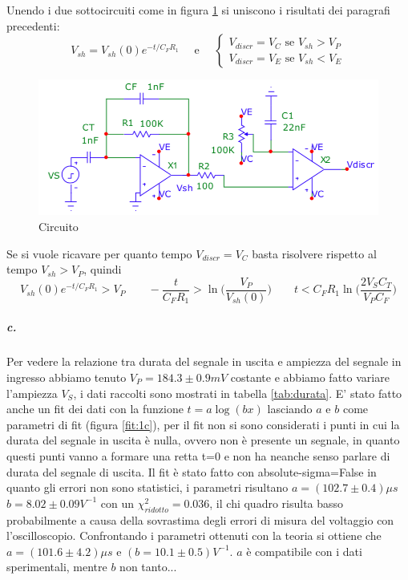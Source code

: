 \documentclass{article}
\newcommand{\vz}{V_{sh}(0)}
\begin{document}
		Unendo i due sottocircuiti come in figura \ref{fig:circ} si uniscono i risultati dei paragrafi precedenti:
		\begin{equation}
			V_{sh}=\vz e^{-t/C_FR_1}\quad \textrm{ e }\quad 
			\begin{cases}
				V_{discr}=V_C \textrm{ se } V_{sh}>V_P\\
				V_{discr}=V_E \textrm{ se } V_{sh}<V_E
			\end{cases}
		\end{equation}
		\begin{figure}
			\label{fig:circ}
			\centering
			\includegraphics[width=120mm]{immagini/circa.png}
			\caption{Circuito}
		\end{figure}
		Se si vuole ricavare per quanto tempo $V_{discr}=V_C$ basta risolvere rispetto al tempo $V_{sh}>V_P$, quindi
		\begin{equation}
			\vz e^{-t/C_FR_1}>V_P\qquad-\frac{t}{C_FR_1}>\ln \bigg(\frac{V_P}{\vz }\bigg)\qquad t<C_FR_1\ln \bigg(\frac{2V_SC_T}{V_PC_F}\bigg)
		\end{equation}

	
	\subparagraph{c.}
		Per vedere la relazione tra durata del segnale in uscita e ampiezza del segnale in ingresso abbiamo tenuto $V_P=184.3\pm0.9 mV$ costante e abbiamo fatto variare l'ampiezza $V_S$, i dati raccolti sono mostrati in tabella \ref{tab:durata}. E' stato fatto anche un fit dei dati con la funzione $t=a \log(bx)$ lasciando $a$ e $b$ come parametri di fit (figura \ref{fit:1c}), per il fit non si sono considerati i punti in cui la durata del segnale in uscita è nulla, ovvero non è presente un segnale, in quanto questi punti vanno a formare una retta t=0 e non ha neanche senso parlare di durata del segnale di uscita.\newline
		Il fit  è stato fatto con absolute-sigma=False in quanto gli errori non sono statistici, i parametri risultano $a=(102.7\pm0.4)\mu s$ $b=8.02\pm0.09 V^{-1}$ con un $\chi^2_{ridotto}=0.036$, il chi quadro risulta basso probabilmente a causa della sovrastima degli errori di misura del voltaggio con l'oscilloscopio. Confrontando i parametri ottenuti con la teoria si ottiene che $a=(101.6\pm4.2)\mu s$ e $(b=10.1\pm0.5)V^{-1}$. $a$ è compatibile con i dati sperimentali, mentre $b$ non tanto...
	
\end{document}
